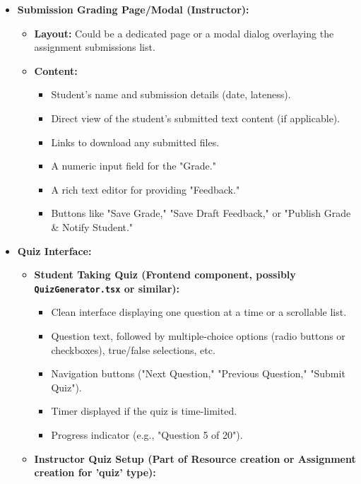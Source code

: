 \documentclass[12pt,a4paper]{article}
\begin{document}
\begin{itemize}
\begin{itemize}
\begin{itemize}
        \end{itemize}
    \end{itemize}
    \item \textbf{Submission Grading Page/Modal (Instructor):}
    \begin{itemize}
        \item \textbf{Layout:} Could be a dedicated page or a modal dialog overlaying the assignment submissions list.
        \item \textbf{Content:}
        \begin{itemize}
            \item Student's name and submission details (date, lateness).
            \item Direct view of the student's submitted text content (if applicable).
            \item Links to download any submitted files.
            \item A numeric input field for the "Grade."
            \item A rich text editor for providing "Feedback."
            \item Buttons like "Save Grade," "Save Draft Feedback," or "Publish Grade \& Notify Student."
        \end{itemize}
    \end{itemize}
    \item \textbf{Quiz Interface:}
    \begin{itemize}
        \item \textbf{Student Taking Quiz (Frontend component, possibly \texttt{QuizGenerator.tsx} or similar):}
        \begin{itemize}
            \item Clean interface displaying one question at a time or a scrollable list.
            \item Question text, followed by multiple-choice options (radio buttons or checkboxes), true/false selections, etc.
            \item Navigation buttons ("Next Question," "Previous Question," "Submit Quiz").
            \item Timer displayed if the quiz is time-limited.
            \item Progress indicator (e.g., "Question 5 of 20").
        \end{itemize}
        \item \textbf{Instructor Quiz Setup (Part of Resource creation or Assignment creation for 'quiz' type):}
        \begin{itemize}

\end{itemize}
\end{itemize}
\end{itemize}
\end{document}
